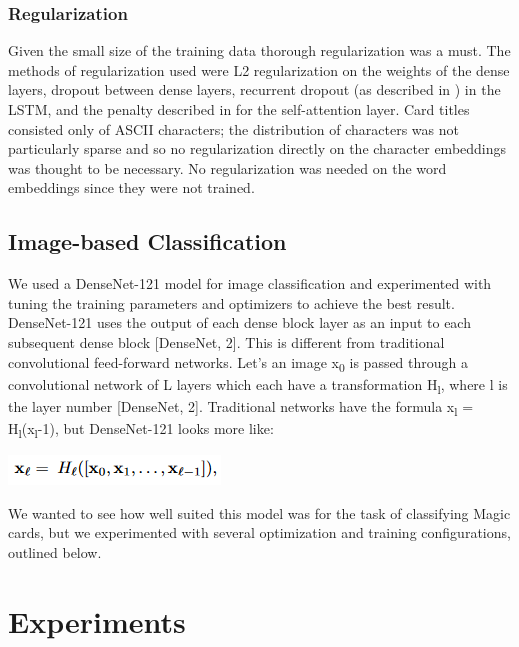 \documentclass[letterpaper]{article} %
\begin{document}
\subsubsection{Regularization}

Given the small size of the training data thorough regularization was a must.
The methods of regularization used were
L2 regularization on the weights of the dense layers,
dropout between dense layers,
recurrent dropout (as described in \cite{Gal2016ATG}) in the LSTM,
and the penalty described in \cite{Lin2017ASS} for the self-attention layer.
Card titles consisted only of ASCII characters;
the distribution of characters was not particularly sparse
and so no regularization directly on the character embeddings
was thought to be necessary.
No regularization was needed on the word embeddings since they were not trained.

\subsection{Image-based Classification}

We used a DenseNet-121 model for image classification and experimented with
tuning the training parameters and optimizers to achieve the best result.
DenseNet-121 uses the output of each dense block layer as an input to each
subsequent dense block [DenseNet, 2]. This is different from traditional
convolutional feed-forward networks. Let’s an image x\textsubscript{0} is passed through a
convolutional network of L layers which each have a transformation H\textsubscript{l}, where l
is the layer number [DenseNet, 2]. Traditional networks have the formula
x\textsubscript{l} = H\textsubscript{l}(x\textsubscript{l}-1), but DenseNet-121 looks more like:

\begin{center}
  \includegraphics[width=.3\textwidth]{densenet-formula}
\end{center}

We wanted to see how well suited this model was for the task of classifying Magic cards,
but we experimented with several optimization and training configurations,
outlined below.

\section{Experiments}
\end{document}
